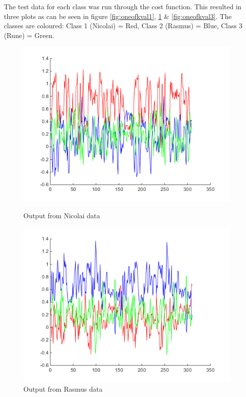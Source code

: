 The test data for each class was run through the cost function. This resulted in three plots as can be seen in figure \ref{fig:oneofkval1}, \ref{fig:oneofkval2} \& \ref{fig:oneofkval3}. The classes are coloured: Class 1 (Nicolai) = Red,  Class 2 (Rasmus) = Blue,  Class 3 (Rune) = Green.
\begin{figure}[H]
  \includegraphics[width=\linewidth]{billeder/oneofkval1}
  \caption{Output from Nicolai data}\label{fig:oneofkval1}
\endminipage\hfill
{}
  \includegraphics[width=\linewidth]{billeder/oneofkval2}
  \caption{Output from Rasmus data }\label{fig:oneofkval2}
\endminipage\hfill
{}%

\end{figure}
